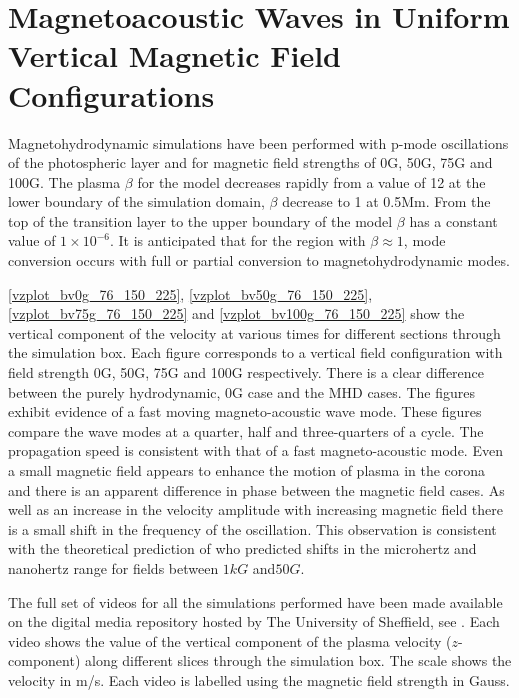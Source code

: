\documentclass{aastex62}
\begin{document}
\section{Magnetoacoustic Waves in Uniform Vertical Magnetic Field Configurations}
Magnetohydrodynamic simulations have been performed with p-mode oscillations of the photospheric layer and for magnetic field strengths of 0G, 50G, 75G and 100G. The plasma $\beta$ for the model decreases rapidly from a value of 12 at the lower boundary of the simulation domain, $\beta$ decrease to 1 at 0.5Mm. From the top of the transition layer to the upper boundary of the model $\beta $ has a constant value of $1\times 10^{-6}$. It is anticipated that for the region with $\beta \approx 1$, mode conversion occurs with full or partial conversion to magnetohydrodynamic modes. 

\ref{vzplot_bv0g_76_150_225}, \ref{vzplot_bv50g_76_150_225}, \ref{vzplot_bv75g_76_150_225} and \ref{vzplot_bv100g_76_150_225} show the vertical component of the velocity at various times for different sections through the simulation box. Each figure corresponds to a vertical field configuration with field strength 0G, 50G, 75G and 100G respectively. There is a clear difference between the purely hydrodynamic, 0G case and the MHD cases. The figures exhibit evidence of a fast moving magneto-acoustic wave mode. These figures compare the wave modes at a quarter, half and three-quarters of a cycle. The propagation speed is consistent with that of a fast magneto-acoustic mode. Even a small magnetic field appears to enhance the motion of plasma in the corona and  there is an apparent difference in phase between the magnetic field cases. As well as an increase in the velocity amplitude with increasing magnetic field there is a small shift in the frequency of the oscillation. This observation is consistent with the theoretical prediction of \citet{Hindman1996} who predicted shifts in the microhertz and nanohertz range for fields between $1kG$ and$50G$. 

The full set of videos for all the simulations performed have been made available on the digital media repository hosted by The University of Sheffield, see \citet{Griffiths2018}. Each video shows the value of the vertical component of the plasma velocity ($z$-component) along different slices through the simulation box. The scale shows the velocity in m/s.  Each video is labelled using the magnetic field strength in Gauss.
\end{document}
